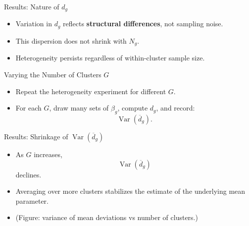 \documentclass[
  ignorenonframetext,
]{beamer}
\providecommand{\tightlist}{%
  \setlength{\itemsep}{0pt}\setlength{\parskip}{0pt}}
\begin{document}
\begin{frame}{Results: Nature of \(d_g\)}
\label{results-nature-of-d_g}
\begin{itemize}
\tightlist
\item
  Variation in \(d_g\) reflects \textbf{structural differences}, not
  sampling noise.\\
\item
  This dispersion does not shrink with \(N_g\).\\
\item
  Heterogeneity persists regardless of within-cluster sample size.
\end{itemize}
\end{frame}

\begin{frame}{Varying the Number of Clusters \(G\)}
\label{varying-the-number-of-clusters-g}
\begin{itemize}
\tightlist
\item
  Repeat the heterogeneity experiment for different \(G\).\\
\item
  For each \(G\), draw many sets of \(\beta_g\), compute \(d_g\), and
  record: \[
  \operatorname{Var}(\overline{d}_g).
  \]
\end{itemize}
\end{frame}

\begin{frame}{Results: Shrinkage of
\(\operatorname{Var}(\overline{d}_g)\)}
\label{results-shrinkage-of-operatornamevaroverlined_g}
\begin{itemize}
\tightlist
\item
  As \(G\) increases,\\
  \[
  \operatorname{Var}(\overline{d}_g)
  \] declines.\\
\item
  Averaging over more clusters stabilizes the estimate of the underlying
  mean parameter.\\
\item
  (Figure: variance of mean deviations vs number of clusters.)
\end{itemize}
\end{frame}
\end{document}
